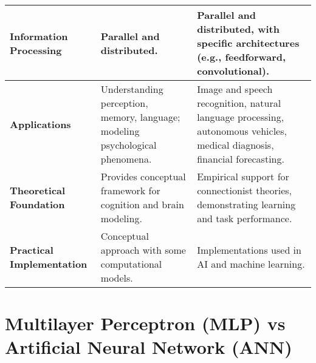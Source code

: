 \begin{alternateColorTable}
\begin{longtable}{|>{\raggedright\arraybackslash}p{3cm}|>{\raggedright\arraybackslash}p{6cm}|>{\raggedright\arraybackslash}p{6cm}|}
    \textbf{Information Processing} & Parallel and distributed. & Parallel and distributed, with specific architectures (e.g., feedforward, convolutional). \\
    \hline
    
    \textbf{Applications} & Understanding perception, memory, language; modeling psychological phenomena. & Image and speech recognition, natural language processing, autonomous vehicles, medical diagnosis, financial forecasting. \\
    \hline
    
    \textbf{Theoretical Foundation} & Provides conceptual framework for cognition and brain modeling. & Empirical support for connectionist theories, demonstrating learning and task performance. \\
    \hline

    \textbf{Practical Implementation} & Conceptual approach with some computational models. & Implementations used in AI and machine learning. \\
    \hline
\end{longtable}
\end{alternateColorTable}


\section{Multilayer Perceptron (MLP) vs Artificial Neural Network (ANN)}\label{mlp vs ann}

